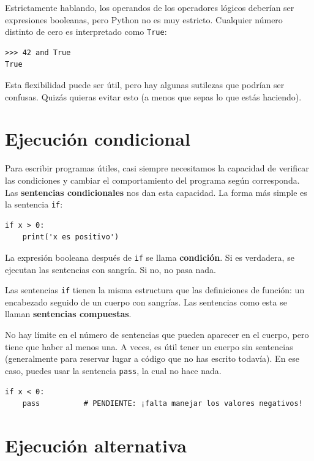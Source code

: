 \documentclass[10pt]{book}
\begin{document}
Estrictamente hablando, los operandos de los operadores lógicos deberían ser
expresiones booleanas, pero Python no es muy estricto.
Cualquier número distinto de cero es interpretado como {\tt True}:

\begin{verbatim}
>>> 42 and True
True
\end{verbatim}
%
Esta flexibilidad puede ser útil, pero hay algunas sutilezas
que podrían ser confusas.  Quizás quieras evitar esto (a menos que
sepas lo que estás haciendo).


\section{Ejecución condicional}
\label{conditional.execution}

Para escribir programas útiles, casi siempre necesitamos la capacidad
de verificar las condiciones y cambiar el comportamiento del programa
según corresponda.  Las {\bf sentencias condicionales} nos dan esta capacidad.  La
forma más simple es la sentencia {\tt if}:

\begin{verbatim}
if x > 0:
    print('x es positivo')
\end{verbatim}
%
La expresión booleana después de {\tt if} se
llama {\bf condición}.  Si es verdadera, se ejecutan las sentencias
con sangría.  Si no, no pasa nada.

Las sentencias {\tt if} tienen la misma estructura que las definiciones de función:
un encabezado seguido de un cuerpo con sangrías.  Las sentencias como esta se
llaman {\bf sentencias compuestas}.

No hay límite en el número de sentencias que pueden aparecer en
el cuerpo, pero tiene que haber al menos una.
A veces, es útil tener un cuerpo sin sentencias (generalmente
para reservar lugar a código que no has escrito todavía).  En ese
caso, puedes usar la sentencia {\tt pass}, la cual no hace nada.

\begin{verbatim}
if x < 0:
    pass          # PENDIENTE: ¡falta manejar los valores negativos!
\end{verbatim}
%

\section{Ejecución alternativa}
\label{alternative.execution}
\end{document}

